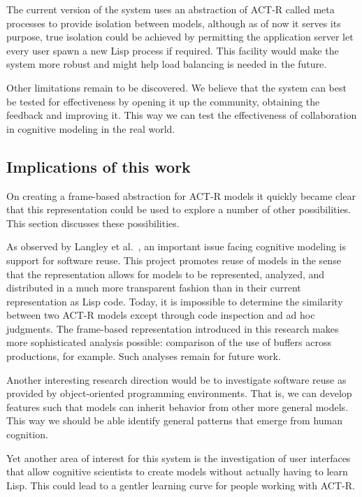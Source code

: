
The current version of the system uses an abstraction of ACT-R called
meta processes to provide isolation between models, although as of now
it serves its purpose, true isolation could be achieved by permitting
the application server let every user spawn a new Lisp process if
required. This facility would make the system more robust and might
help load balancing is needed in the future.

Other limitations remain to be discovered.  We believe that the system
can best be tested for effectiveness by opening it up the community,
obtaining the feedback and improving it. This way we can test the
effectiveness of collaboration in cognitive modeling in the real
world.

\subsection{Implications of this work}

On creating a frame-based abstraction for ACT-R models it quickly
became clear that this representation could be used to explore a
number of other possibilities. This section discusses these
possibilities.

As observed by Langley et al.~\cite{citeulike:4182324}, an important
issue facing cognitive modeling is support for software reuse. This
project promotes reuse of models in the sense that the representation
allows for models to be represented, analyzed, and distributed in a
much more transparent fashion than in their current representation as
Lisp code.  Today, it is impossible to determine the similarity
between two ACT-R models except through code inspection and ad hoc
judgments.  The frame-based representation introduced in this research
makes more sophisticated analysis possible: comparison of the use of
buffers across productions, for example.  Such analyses remain for
future work.

Another interesting research direction would be to investigate software
reuse as provided by object-oriented programming environments.  That
is, we can develop features such that models can inherit behavior from
other more general models.  This way we should be able identify
general patterns that emerge from human cognition.

Yet another area of interest for this system is the investigation of
user interfaces that allow cognitive scientists to create models
without actually having to learn Lisp. This could lead to a gentler
learning curve for people working with ACT-R.

